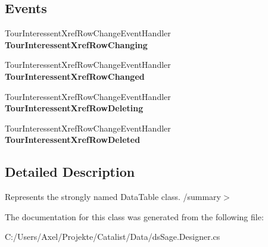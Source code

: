 \subsection*{Events}
\begin{DoxyCompactItemize}
\item 
Tour\+Interessent\+Xref\+Row\+Change\+Event\+Handler {\bfseries Tour\+Interessent\+Xref\+Row\+Changing}\hypertarget{class_products_1_1_data_1_1ds_sage_1_1_tour_interessent_xref_data_table_ad78e58ff3109ce92b96531cba566679c}{}\label{class_products_1_1_data_1_1ds_sage_1_1_tour_interessent_xref_data_table_ad78e58ff3109ce92b96531cba566679c}

\item 
Tour\+Interessent\+Xref\+Row\+Change\+Event\+Handler {\bfseries Tour\+Interessent\+Xref\+Row\+Changed}\hypertarget{class_products_1_1_data_1_1ds_sage_1_1_tour_interessent_xref_data_table_a0b5ab987baff2695be0ee17a96d610fb}{}\label{class_products_1_1_data_1_1ds_sage_1_1_tour_interessent_xref_data_table_a0b5ab987baff2695be0ee17a96d610fb}

\item 
Tour\+Interessent\+Xref\+Row\+Change\+Event\+Handler {\bfseries Tour\+Interessent\+Xref\+Row\+Deleting}\hypertarget{class_products_1_1_data_1_1ds_sage_1_1_tour_interessent_xref_data_table_a92a68ce22b504a1f598ad2eea7f1c62f}{}\label{class_products_1_1_data_1_1ds_sage_1_1_tour_interessent_xref_data_table_a92a68ce22b504a1f598ad2eea7f1c62f}

\item 
Tour\+Interessent\+Xref\+Row\+Change\+Event\+Handler {\bfseries Tour\+Interessent\+Xref\+Row\+Deleted}\hypertarget{class_products_1_1_data_1_1ds_sage_1_1_tour_interessent_xref_data_table_a2a49eb3ef139e447966ea0deb7ea6e8f}{}\label{class_products_1_1_data_1_1ds_sage_1_1_tour_interessent_xref_data_table_a2a49eb3ef139e447966ea0deb7ea6e8f}

\end{DoxyCompactItemize}


\subsection{Detailed Description}
Represents the strongly named Data\+Table class. /summary$>$ 

The documentation for this class was generated from the following file\+:\begin{DoxyCompactItemize}
\item 
C\+:/\+Users/\+Axel/\+Projekte/\+Catalist/\+Data/ds\+Sage.\+Designer.\+cs\end{DoxyCompactItemize}
